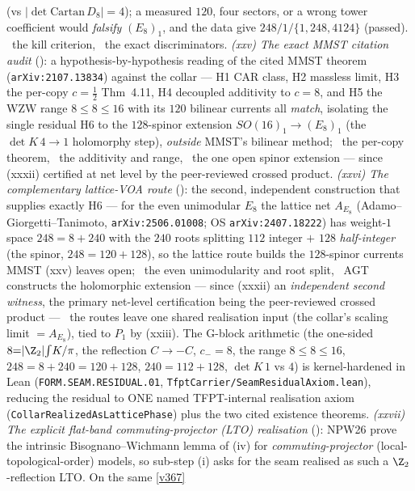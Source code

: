 (vs $|\!\det\mathrm{Cartan}\,D_8|{=}4$); a measured $120$, four sectors, or a wrong tower coefficient would
\emph{falsify} $(E_8)_1$, and the data give $248/1/\{1,248,4124\}$ (passed). \mX\ the kill criterion, \mE\ the exact
discriminators. \emph{(xxv) The exact MMST citation audit} (): a
hypothesis-by-hypothesis reading of the cited MMST theorem (\texttt{arXiv:2107.13834}) against the collar --- H1 CAR
class, H2 massless limit, H3 the per-copy $c{=}\tfrac12$ Thm~4.11, H4 decoupled additivity to $c{=}8$, and H5 the WZW
range $8{\le}8{\le}16$ with its $120$ bilinear currents all \emph{match}, isolating the single residual H6 to the
$128$-spinor extension $SO(16)_1{\to}(E_8)_1$ (the $\det K\,4{\to}1$ holomorphy step), \emph{outside} MMST's bilinear
method; \mE\ the per-copy theorem, \mC\ the additivity and range, \mO\ the one open spinor extension --- since
(xxxii) certified at net level by the peer-reviewed crossed product. \emph{(xxvi)
The complementary lattice-VOA route} (): the second, independent
construction that supplies exactly H6 --- for the even unimodular $E_8$ the lattice net $A_{E_8}$
(Adamo--Giorgetti--Tanimoto, \texttt{arXiv:2506.01008}; OS \texttt{arXiv:2407.18222}) has weight-$1$ space
$248{=}8{+}240$ with the $240$ roots splitting $112$ integer $+$ $128$ \emph{half-integer} (the spinor,
$248{=}120{+}128$), so the lattice route builds the $128$-spinor currents MMST (xxv) leaves open; \mE\ the even
unimodularity and root split, \mC\ AGT constructs the holomorphic extension --- since (xxxii) an \emph{independent
second witness}, the primary net-level certification being the peer-reviewed crossed product --- \mO\ the routes
leave one shared realisation input (the collar's scaling limit $={}A_{E_8}$), tied to $P_1$ by (xxiii). The G-block arithmetic
(the one-sided $8{=}|\Z_2|\!\int\!K/\pi$, the reflection $C{\to}{-}C$, $c_-{=}8$, the range $8{\le}8{\le}16$,
$248{=}8{+}240{=}120{+}128$, $240{=}112{+}128$, $\det K\,1$ vs $4$) is kernel-hardened in Lean
(\texttt{FORM.SEAM.RESIDUAL.01}, \texttt{TfptCarrier/SeamResidualAxiom.lean}), reducing the residual to ONE named
TFPT-internal realisation axiom (\texttt{CollarRealizedAsLatticePhase}) plus the two cited existence theorems.
\emph{(xxvii) The explicit flat-band commuting-projector (LTO) realisation} (): NPW26
prove the intrinsic Bisognano--Wichmann lemma of (iv) for \emph{commuting-projector} (local-topological-order)
models, so sub-step (i) asks for the seam realised as such a $\Z_2$-reflection LTO. On the same \vref{v367}

